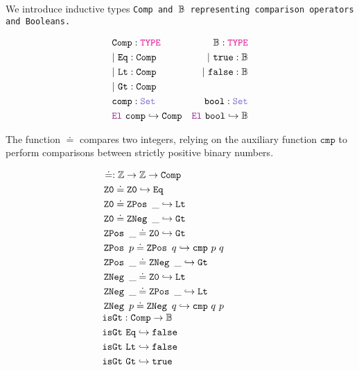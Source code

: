 \begin{definition}\label{def:arith-inequalities-def}
We introduce inductive types \tt{Comp}  and $\mathbb{B}$ representing comparison operators and Booleans.

\begin{align*}
&\tt{Comp}: \type{} & \B: \type{} \\
&|~\tt{Eq}: \tt{Comp} & |~\tt{true}: \B \\
&|~\tt{Lt}: \tt{Comp} & |~\tt{false}: \B \\
&|~\tt{Gt}: \tt{Comp} & \\
&\tt{comp}: \set & \tt{bool}: \set  \\
&\el{}~\tt{comp} \re \tt{Comp} & \el{}~\tt{bool} \re \B
\end{align*}


The function $\doteq$ compares two integers, relying on the auxiliary function $\texttt{cmp}$ to perform comparisons between strictly positive binary numbers.

\[
\begin{array}[t]{l@{\hspace{4em}}l}
\begin{aligned}
&\doteq : \Z \ra \Z \ra \tt{Comp} \\
& \ZO \doteq \ZO \re \tt{Eq} \\
& \ZO \doteq \ZPos~\_ \re \tt{Lt} \\
& \ZO \doteq \ZNeg~\_ \re \tt{Gt} \\
& \ZPos~\_ \doteq \ZO \re \tt{Gt} \\
& \ZPos~p \doteq \ZPos~q \re \tt{cmp}~p~q \\
& \ZPos~\_ \doteq \ZNeg~\_ \re \tt{Gt} \\
& \ZNeg~\_ \doteq \ZO \re \tt{Lt} \\
& \ZNeg~\_ \doteq \ZPos~\_ \re \tt{Lt} \\
& \ZNeg~p \doteq \ZNeg~q \re \tt{cmp}~q~p
\end{aligned}
\\[3em]
\begin{aligned}
  &\tt{isGt} : \tt{Comp} \ra \B \\
  &\tt{isGt}~\tt{Eq} \re \tt{false} \\
  &\tt{isGt}~\tt{Lt} \re \tt{false} \\
  &\tt{isGt}~\tt{Gt} \re \tt{true}
\end{aligned}
\end{array}
\]


\end{definition}
